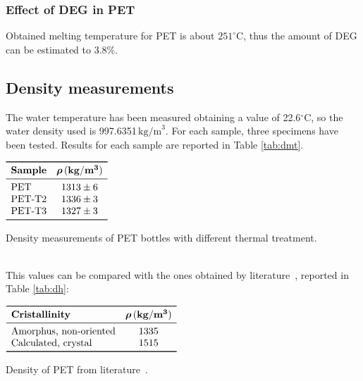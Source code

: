 \documentclass[a4paper, 11pt]{article}
\begin{document}
\subsubsection{Effect of DEG in PET}

Obtained melting temperature for PET is about $251^\circ$C, thus the amount of DEG can be estimated to 3.8\%. 

\subsection{Density measurements}

The water temperature has been measured  obtaining a value of 22.6$^\circ$C, so the water density used is 997.6351$\, \text{kg/m}^{3}$. For each sample, three specimens have been tested. Results for each sample are reported in Table \ref{tab:dmt}. 
\begin{table}[htp]
\centering
$
\begin{array}{lcc}
\toprule
\textbf{Sample} & \boldsymbol{\rho}\,(\mathbf{kg/m^{3}})\\
\midrule
\text{PET} & 1313\pm 6\\
\text{PET-T2} & 1336\pm 3 \\
\text{PET-T3} & 1327\pm 3 \\
\bottomrule
\end{array}
$
\caption{Density measurements of PET bottles with different thermal treatment.}
\label{tab:dmt}
\end{table}\\
This values can be compared with the ones obtained by literature~\cite{handbook}, reported in Table \ref{tab:dh}:
\begin{table}[htp]
\centering
$
\begin{array}{lc}
\toprule
\textbf{Cristallinity} & \boldsymbol{\rho}\,(\mathbf{kg/m^{3}})\\
\midrule
\text{Amorphus, non-oriented} & 1335\\
\text{Calculated, crystal} & 1515 \\
\bottomrule
\end{array}
$
\caption{Density of PET from literature~\cite{handbook}.}
\label{tab:dh}
\end{table}
\end{document}
